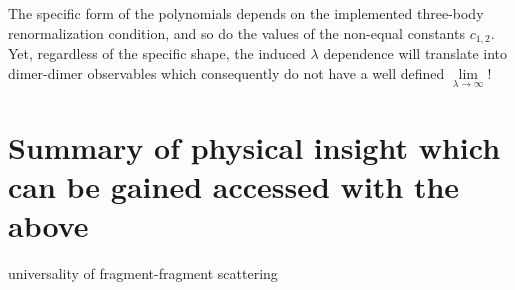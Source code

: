 \documentclass[onecolumn,preprint,superscriptaddress,nofootinbib,notitlepage,10pt,linenumbers]{revtex4-1}
\begin{document}
The specific form of the polynomials depends on the implemented three-body renormalization condition, and so do
the values of the non-equal constants $c_{1,2}$. Yet, regardless of the specific shape, the induced $\lambda$ dependence
will translate into dimer-dimer observables which consequently do not have a well defined $\lim\limits_{\lambda\to\infty}$!

\newpage
\section{Summary of physical insight which can be gained accessed with the above}

\begin{description}
\item[universality of fragment-fragment scattering]
\end{description}	



\end{document}
